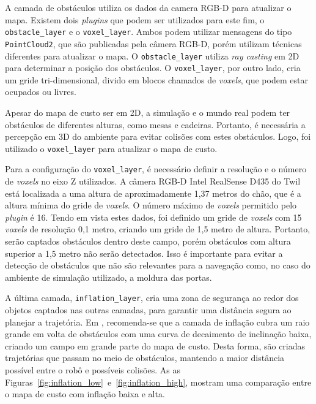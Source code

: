 \documentclass[repeatfields,xlists,xpacks,oneside,yearsonly]{ufrgscca}
\begin{document}
A camada de obstáculos utiliza os dados da camera RGB-D para atualizar o mapa.
Existem dois \textit{plugins} que podem ser utilizados para este fim, o
\texttt{obstacle\_layer} e o \texttt{voxel\_layer}.
Ambos podem utilizar mensagens do tipo \texttt{PointCloud2}, que são publicadas
pela câmera RGB-D, porém utilizam técnicas diferentes para atualizar o mapa.
O \texttt{obstacle\_layer} utiliza \textit{ray casting} em 2D para 
determinar a posição dos obstáculos. 
O \texttt{voxel\_layer}, por outro lado, cria um gride tri-dimensional, 
divido em blocos chamados de \textit{voxels}, que podem estar ocupados ou livres.

Apesar do mapa de custo ser em 2D, a simulação e o mundo real podem ter obstáculos
de diferentes alturas, como mesas e cadeiras. Portanto, é necessária a percepção em 
3D do ambiente para evitar colisões com estes obstáculos. Logo, foi utilizado o
\texttt{voxel\_layer} para atualizar o mapa de custo.

Para a configuração do \texttt{voxel\_layer}, é necessário definir a resolução
e o número de \textit{voxels} no eixo Z utilizados. 
A câmera RGB-D Intel RealSense D435 do Twil está localizada a uma altura de aproximadamente
1,37 metros do chão, que é a altura mínima do gride de \textit{voxels}.
O número máximo de \textit{voxels} permitido pelo \textit{plugin} é 16.
Tendo em vista estes dados, foi definido um gride de \textit{voxels} com 15 \textit{voxels}
de resolução 0,1 metro, criando um gride de 1,5 metro de altura.
Portanto, serão captados obstáculos dentro deste campo, porém obstáculos com altura
superior a 1,5 metro não serão detectados.
Isso é importante para evitar a detecção de obstáculos que não são relevantes para
a navegação como, no caso do ambiente de simulação utilizado, a moldura das portas.


A última camada, \texttt{inflation\_layer}, cria uma zona de segurança ao redor
dos objetos captados nas outras camadas, para garantir uma distância segura
ao planejar a trajetória.
Em \textcite{ros_tuning_guide}, recomenda-se que a camada de inflação cubra 
um raio grande em volta de obstáculos com uma curva de decaimento de
inclinação baixa, criando um campo em grande parte do mapa de custo.
Desta forma, são criadas trajetórias que passam no meio de obstáculos, 
mantendo a maior distância possível entre o robô e possíveis colisões.
As as Figuras~\ref{fig:inflation_low}~e~\ref{fig:inflation_high}, mostram
uma comparação entre o mapa de custo com inflação baixa e alta.
\end{document}
